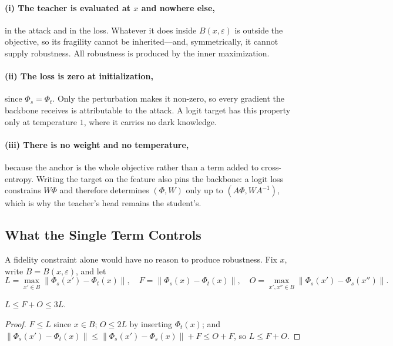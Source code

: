 \paragraph{(i) The teacher is evaluated at $x$ and nowhere else,} in the attack and in the loss.
Whatever it does inside $B(x,\varepsilon)$ is outside the objective, so its fragility cannot be
inherited---and, symmetrically, it cannot supply robustness. All robustness is produced by the inner
maximization.

\paragraph{(ii) The loss is zero at initialization,} since $\Phi_s=\Phi_t$. Only the perturbation makes
it non-zero, so every gradient the backbone receives is attributable to the attack. A logit target has
this property only at temperature $1$, where it carries no dark knowledge.

\paragraph{(iii) There is no weight and no temperature,} because the anchor is the whole objective
rather than a term added to cross-entropy. Writing the target on the feature also pins the backbone: a
logit loss constrains $W\Phi$ and therefore determines $(\Phi,W)$ only up to $(A\Phi,WA^{-1})$, which
is why the teacher's head remains the student's.

\subsection{What the Single Term Controls}
\label{sec:decomp}

A fidelity constraint alone would have no reason to produce robustness. Fix $x$, write
$B=B(x,\varepsilon)$, and let
\begin{equation}
L=\max_{x'\in B}\lVert\Phi_s(x')-\Phi_t(x)\rVert,\quad
F=\lVert\Phi_s(x)-\Phi_t(x)\rVert,\quad
O=\max_{x',x''\in B}\lVert\Phi_s(x')-\Phi_s(x'')\rVert.
\label{eq:LFO}
\end{equation}

\begin{proposition}
\label{prop:decomp}
$L\le F+O\le 3L$.
\end{proposition}

\begin{proof}
$F\le L$ since $x\in B$; $O\le 2L$ by inserting $\Phi_t(x)$; and
$\lVert\Phi_s(x')-\Phi_t(x)\rVert\le\lVert\Phi_s(x')-\Phi_s(x)\rVert+F\le O+F$, so $L\le F+O$.
\end{proof}

